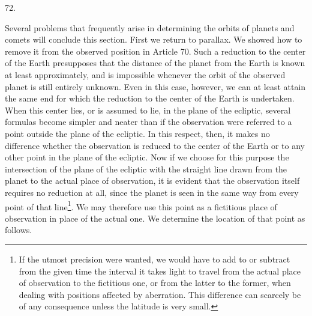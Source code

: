 \par{}\medskip
\hypertarget{native-094-article072}{}
\begin{center}72.\end{center}
Several problems that frequently arise in determining the orbits of planets and comets will conclude this section. First we return to parallax. We showed how to remove it from the observed position in Article 70. Such a reduction to the center of the Earth presupposes that the distance of the planet from the Earth is known at least approximately, and is impossible whenever the orbit of the observed planet is still entirely unknown. Even in this case, however, we can at least attain the same end for which the reduction to the center of the Earth is undertaken. When this center lies, or is assumed to lie, in the plane of the ecliptic, several formulas become simpler and neater than if the observation were referred to a point outside the plane of the ecliptic. In this respect, then, it makes no difference whether the observation is reduced to the center of the Earth or to any other point in the plane of the ecliptic. Now if we choose for this purpose the intersection of the plane of the ecliptic with the straight line drawn from the planet to the actual place of observation, it is evident that the observation itself requires no reduction at all, since the planet is seen in the same way from every point of that line\footnote{If the utmost precision were wanted, we would have to add to or subtract from the given time the interval it takes light to travel from the actual place of observation to the fictitious one, or from the latter to the former, when dealing with positions affected by aberration. This difference can scarcely be of any consequence unless the latitude is very small.}. We may therefore use this point as a fictitious place of observation in place of the actual one. We determine the location of that point as follows.


